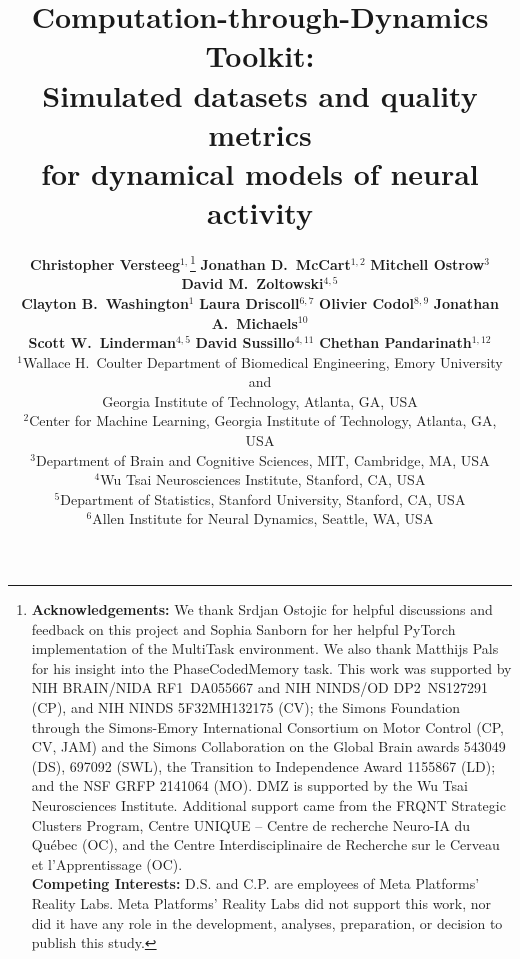 \documentclass{article}
\title{Computation-through-Dynamics Toolkit: \\ Simulated datasets and quality metrics \\ for dynamical models of neural activity}
\begin{document}
\author{
\textbf{Christopher Versteeg}$^{1,}$\thanks{
  \textbf{Acknowledgements:} We thank Srdjan Ostojic for helpful discussions and feedback on this project and
  Sophia Sanborn for her helpful PyTorch implementation of the MultiTask environment. We also thank Matthijs Pals for his insight into the PhaseCodedMemory task.
  This work was supported by NIH BRAIN/NIDA RF1~DA055667 and NIH NINDS/OD DP2~NS127291 (CP),
  and NIH NINDS 5F32MH132175 (CV); the Simons Foundation through the Simons-Emory International
  Consortium on Motor Control (CP, CV, JAM) and the Simons Collaboration on the Global Brain awards
  543049 (DS), 697092 (SWL), the Transition to Independence Award 1155867 (LD); and the NSF GRFP 2141064 (MO).
  DMZ is supported by the Wu Tsai Neurosciences Institute. Additional support came from the FRQNT Strategic
  Clusters Program, Centre UNIQUE -- Centre de recherche Neuro-IA du Québec (OC), and the Centre
  Interdisciplinaire de Recherche sur le Cerveau et l’Apprentissage (OC).
  \\
  \textbf{Competing Interests:} D.S. and C.P. are employees of Meta Platforms’ Reality Labs.
  Meta Platforms’ Reality Labs did not support this work, nor did it have any role in the development, analyses, preparation, or decision to publish this study.
} \quad
\textbf{Jonathan D.\ McCart}$^{1,2}$\quad
\textbf{Mitchell Ostrow}$^{3}$\quad
\textbf{David M.\ Zoltowski}$^{4,5}$\\
\textbf{Clayton B.\ Washington}$^{1}$\quad
\textbf{Laura Driscoll}$^{6,7}$\quad
\textbf{Olivier Codol}$^{8,9}$\quad
\textbf{Jonathan A.\ Michaels}$^{10}$\\
\textbf{Scott W.\ Linderman}$^{4,5}$\quad
\textbf{David Sussillo}$^{4,11}$\quad
\textbf{Chethan Pandarinath}$^{1,12}$\\[6pt]
\small $^{1}$Wallace H.\ Coulter Department of Biomedical Engineering, Emory University and \\
\small \quad Georgia Institute of Technology, Atlanta, GA, USA \\
\small $^{2}$Center for Machine Learning, Georgia Institute of Technology, Atlanta, GA, USA \\
\small $^{3}$Department of Brain and Cognitive Sciences, MIT, Cambridge, MA, USA \\
\small $^{4}$Wu Tsai Neurosciences Institute, Stanford, CA, USA \\
\small $^{5}$Department of Statistics, Stanford University, Stanford, CA, USA \\
\small $^{6}$Allen Institute for Neural Dynamics, Seattle, WA, USA \\
}
\end{document}
